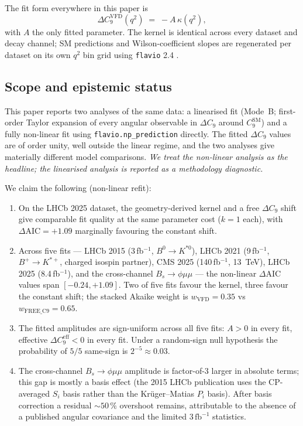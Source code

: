 The fit form everywhere in this paper is
\begin{equation}\label{eq:fit_form}
\Delta C_{9}^{\mathrm{VFD}}(q^{2}) \;=\; -A\,\kappa(q^{2}),
\end{equation}
with $A$ the only fitted parameter. The kernel is identical across
every dataset and decay channel; SM predictions and Wilson-coefficient
slopes are regenerated per dataset on its own $q^{2}$ bin grid using
\texttt{flavio} 2.4 \citep{Straub2018Flavio}.

\subsection*{Scope and epistemic status}

This paper reports two analyses of the same data: a linearised fit
(Mode~B; first-order Taylor expansion of every angular observable
in $\Delta C_{9}$ around $C_{9}^{\mathrm{SM}}$) and a fully
non-linear fit using \texttt{flavio.np\_prediction} directly. The
fitted $\Delta C_{9}$ values are of order unity, well outside the
linear regime, and the two analyses give materially different model
comparisons. \emph{We treat the non-linear analysis as the headline;
the linearised analysis is reported as a methodology diagnostic.}

We claim the following (non-linear refit):
\begin{enumerate}
\item On the LHCb 2025 dataset, the geometry-derived kernel and a
  free $\Delta C_{9}$ shift give comparable fit quality at the same
  parameter cost ($k=1$ each), with $\Delta\mathrm{AIC}=+1.09$
  marginally favouring the constant shift.
\item Across five fits — LHCb 2015 (3\,fb$^{-1}$,
  $B^{0}\!\to\! K^{*0}$), LHCb 2021 (9\,fb$^{-1}$, $B^{+}\!\to\!K^{*+}$,
  charged isospin partner), CMS 2025 (140\,fb$^{-1}$, 13~TeV),
  LHCb 2025 (8.4\,fb$^{-1}$), and the cross-channel
  $B_{s}\!\to\!\phi\mu\mu$ — the non-linear $\Delta\mathrm{AIC}$
  values span $[-0.24, +1.09]$. Two of five fits favour the kernel,
  three favour the constant shift; the stacked Akaike weight is
  $w_{\mathrm{VFD}}=0.35$ vs $w_{\mathrm{FREE\_C9}}=0.65$.
\item The fitted amplitudes are sign-uniform across all five fits:
  $A>0$ in every fit, effective $\Delta C_{9}^{\mathrm{eff}}<0$ in
  every fit. Under a random-sign null hypothesis the probability
  of $5/5$ same-sign is $2^{-5}\approx 0.03$.
\item The cross-channel $B_{s}\!\to\!\phi\mu\mu$ amplitude is
  factor-of-3 larger in absolute terms; this gap is mostly a basis
  effect (the 2015 LHCb publication uses the CP-averaged $S_{i}$
  basis rather than the Krüger--Matias $P_{i}$ basis). After basis
  correction a residual $\sim 50\,\%$ overshoot remains, attributable
  to the absence of a published angular covariance and the limited
  $3\,\mathrm{fb}^{-1}$ statistics.
\end{enumerate}

